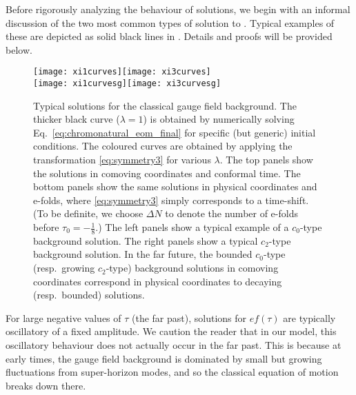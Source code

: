 Before rigorously analyzing the behaviour of solutions, we begin with an informal discussion of the two most common types of solution to . Typical examples of these are depicted as solid black lines in . Details and proofs will be provided below. 
\begin{figure}[t]
\centering{}\texttt{[image: xi1curves]}\hfill{}\texttt{[image: xi3curves]}\\
\texttt{[image: xi1curvesg]}\hfill{}\texttt{[image: xi3curvesg]}\caption{\label{fig:scaling-symmetry} Typical solutions for the classical gauge field background. The thicker black curve ($\lambda=1$) is obtained by numerically solving Eq.~\eqref{eq:chromonatural_eom_final} for specific (but generic) initial conditions. The coloured curves are obtained by applying the transformation \eqref{eq:symmetry3} for various $\lambda$. The top panels show the solutions in comoving coordinates and conformal time. The bottom panels show the same solutions in physical coordinates and e-folds, where \eqref{eq:symmetry3} simply corresponds to a time-shift. (To be definite, we choose $\Delta N$ to denote the number of e-folds before $\tau_{0}=-\tfrac{1}{8}$.) The left panels show a typical example of a $c_{0}$\protect\nobreakdash-type background solution. The right panels show a typical $c_{2}$\protect\nobreakdash-type background solution. In the far future, the bounded $c_{0}$\protect\nobreakdash-type (resp.~growing $c_{2}$\protect\nobreakdash-type) background solutions in comoving coordinates correspond in physical coordinates to decaying (resp.~bounded) solutions.}
\end{figure}

For large negative values of $\tau$ (the far past), solutions for $ef(\tau)$ are typically oscillatory of a fixed amplitude. We caution the reader that in our model, this oscillatory behaviour does not actually occur in the far past. This is because at early times, the gauge field background is dominated by small but growing fluctuations from super-horizon modes, and so the classical equation of motion breaks down there. \label{ref:no-osc}

